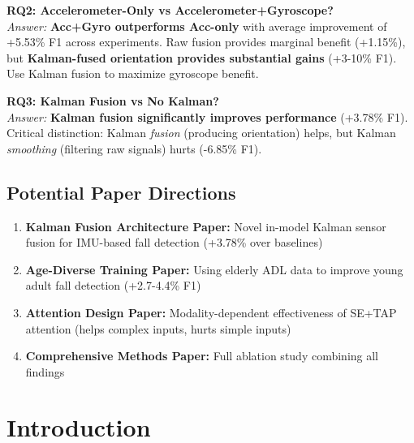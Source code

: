 \documentclass{article}
\begin{document}
\begin{tcolorbox}[colback=green!5,colframe=green!75!black]
\textbf{RQ2: Accelerometer-Only vs Accelerometer+Gyroscope?}\\
\textit{Answer:} \textbf{Acc+Gyro outperforms Acc-only} with average improvement of +5.53\% F1 across experiments. Raw fusion provides marginal benefit (+1.15\%), but \textbf{Kalman-fused orientation provides substantial gains} (+3-10\% F1). Use Kalman fusion to maximize gyroscope benefit.
\end{tcolorbox}

\begin{tcolorbox}[colback=orange!5,colframe=orange!75!black]
\textbf{RQ3: Kalman Fusion vs No Kalman?}\\
\textit{Answer:} \textbf{Kalman fusion significantly improves performance} (+3.78\% F1). Critical distinction: Kalman \textit{fusion} (producing orientation) helps, but Kalman \textit{smoothing} (filtering raw signals) hurts (-6.85\% F1).
\end{tcolorbox}

\subsection*{Potential Paper Directions}

\begin{enumerate}
    \item \textbf{Kalman Fusion Architecture Paper:} Novel in-model Kalman sensor fusion for IMU-based fall detection (+3.78\% over baselines)
    \item \textbf{Age-Diverse Training Paper:} Using elderly ADL data to improve young adult fall detection (+2.7-4.4\% F1)
    \item \textbf{Attention Design Paper:} Modality-dependent effectiveness of SE+TAP attention (helps complex inputs, hurts simple inputs)
    \item \textbf{Comprehensive Methods Paper:} Full ablation study combining all findings
\end{enumerate}

\newpage

\tableofcontents
\newpage

\section{Introduction}
\end{document}
